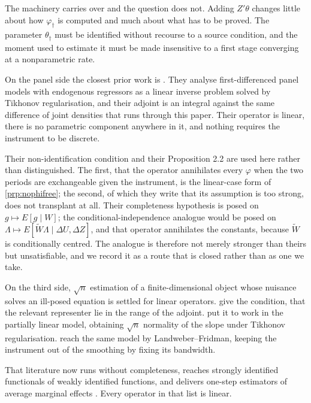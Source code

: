 \documentclass[
  12pt]{article}
\newcommand{\1}[1]{\mathds{1}\left[#1\right]}
\theoremstyle{plain}
\theoremstyle{definition}
\theoremstyle{definition}
\theoremstyle{remark}
\newcommand{\vdagger}{\varphi_{\dagger}}
\begin{document}
The machinery carries over and the question does not. Adding
\(Z'\theta\) changes little about how \(\vdagger\) is computed and much
about what has to be proved. The parameter \(\theta_\dagger\) must be
identified without recourse to a source condition, and the moment used
to estimate it must be made insensitive to a first stage converging at a
nonparametric rate.

On the panel side the closest prior work is \citet{feve2014}. They
analyse first-differenced panel models with endogenous regressors as a
linear inverse problem solved by Tikhonov regularisation, and their
adjoint is an integral against the same difference of joint densities
that runs through this paper. Their operator is linear, there is no
parametric component anywhere in it, and nothing requires the instrument
to be discrete.

Their non-identification condition and their Proposition 2.2 are used
here rather than distinguished. The first, that the operator annihilates
every \(\varphi\) when the two periods are exchangeable given the
instrument, is the linear-case form of \cref{prp:nophifree}; the second,
of which they write that its assumption is too strong, does not
transplant at all. Their completeness hypothesis is posed on
\(g\mapsto E[g\mid W]\); the conditional-independence analogue would be
posed on \(\Lambda\mapsto E[\widetilde W\Lambda\mid\Delta U,\Delta Z]\),
and that operator annihilates the constants, because \(\widetilde W\) is
conditionally centred. The analogue is therefore not merely stronger
than theirs but unsatisfiable, and we record it as a route that is
closed rather than as one we take.

On the third side, \(\sqrt n\) estimation of a finite-dimensional object
whose nuisance solves an ill-posed equation is settled for linear
operators. \citet{severini2006} give the condition, that the relevant
representer lie in the range of the adjoint. \citet{florens2006} put it
to work in the partially linear model, obtaining \(\sqrt n\) normality
of the slope under Tikhonov regularisation. \citet{florenslapenta2024}
reach the same model by Landweber--Fridman, keeping the instrument out
of the smoothing by fixing its bandwidth.

That literature now runs without completeness, reaches strongly
identified functionals of weakly identified functions, and delivers
one-step estimators of average marginal effects
\citep[see][among others]{bennett2023source,bennett2026jrssb,chenq2021,girardlapenta2026}.
Every operator in that list is linear.
\end{document}
